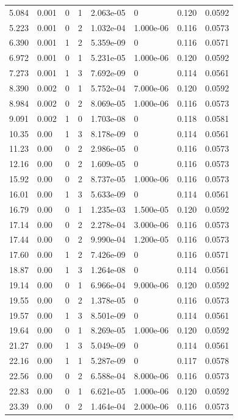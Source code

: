 \documentclass[preview]{standalone}
\begin{document}
{{\begin{tabular}{L{1.2cm}C{1.2cm} C{0.3cm}C{0.5cm} C{1.4cm}C{1.4cm} C{1.4cm}C{1.4cm}}
  5.084  &  0.001  & 0     &  1 &  2.063e-05  & 0  & 0.120 &  0.0592   \\ 
  5.223  &  0.001  & 0     &  2 &  1.032e-04  & 1.000e-06  & 0.116 &  0.0573   \\ 
  6.390  &  0.001  & 1     &  2 &  5.359e-09  & 0  & 0.116 &  0.0571   \\ 
  6.972  &  0.001  & 0     &  1 &  5.231e-05  & 1.000e-06  & 0.120 &  0.0592   \\ 
  7.273  &  0.001  & 1     &  3 &  7.692e-09  & 0  & 0.114 &  0.0561   \\ 
  8.390  &  0.002  & 0     &  1 &  5.752e-04  & 7.000e-06  & 0.120 &  0.0592   \\ 
  8.984  &  0.002  & 0     &  2 &  8.069e-05  & 1.000e-06  & 0.116 &  0.0573   \\ 
  9.091  &  0.002  & 1     &  0 &  1.703e-08  & 0  & 0.118 &  0.0581   \\ 
  10.35  &  0.00  & 1     &  3 &  8.178e-09  & 0  & 0.114 &  0.0561   \\ 
  11.23  &  0.00  & 0     &  2 &  2.986e-05  & 0  & 0.116 &  0.0573   \\ 
  12.16  &  0.00  & 0     &  2 &  1.609e-05  & 0  & 0.116 &  0.0573   \\ 
  15.92  &  0.00  & 0     &  2 &  8.737e-05  & 1.000e-06  & 0.116 &  0.0573   \\ 
  16.01  &  0.00  & 1     &  3 &  5.633e-09  & 0  & 0.114 &  0.0561   \\ 
  16.79  &  0.00  & 0     &  1 &  1.235e-03  & 1.500e-05  & 0.120 &  0.0592   \\ 
  17.14  &  0.00  & 0     &  2 &  2.278e-04  & 3.000e-06  & 0.116 &  0.0573   \\ 
  17.44  &  0.00  & 0     &  2 &  9.990e-04  & 1.200e-05  & 0.116 &  0.0573   \\ 
  17.60  &  0.00  & 1     &  2 &  7.426e-09  & 0  & 0.116 &  0.0571   \\ 
  18.87  &  0.00  & 1     &  3 &  1.264e-08  & 0  & 0.114 &  0.0561   \\ 
  19.14  &  0.00  & 0     &  1 &  6.966e-04  & 9.000e-06  & 0.120 &  0.0592   \\ 
  19.55  &  0.00  & 0     &  2 &  1.378e-05  & 0  & 0.116 &  0.0573   \\ 
  19.57  &  0.00  & 1     &  3 &  8.501e-09  & 0  & 0.114 &  0.0561   \\ 
  19.64  &  0.00  & 0     &  1 &  8.269e-05  & 1.000e-06  & 0.120 &  0.0592   \\ 
  21.27  &  0.00  & 1     &  3 &  5.049e-09  & 0  & 0.114 &  0.0561   \\ 
  22.16  &  0.00  & 1     &  1 &  5.287e-09  & 0  & 0.117 &  0.0578   \\ 
  22.56  &  0.00  & 0     &  2 &  6.588e-04  & 8.000e-06  & 0.116 &  0.0573   \\ 
  22.83  &  0.00  & 0     &  1 &  6.621e-05  & 1.000e-06  & 0.120 &  0.0592   \\ 
  23.39  &  0.00  & 0     &  2 &  1.464e-04  & 2.000e-06  & 0.116 &  0.0573   \\ 
\hline 
\end{tabular} 

}}
\end{document}
